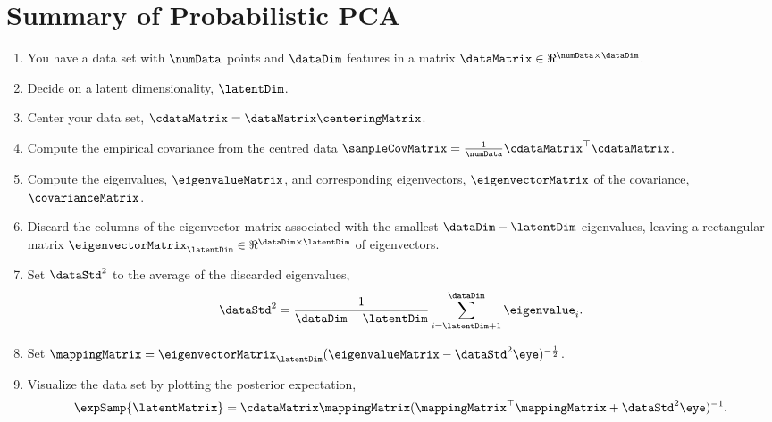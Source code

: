 \section{Summary of Probabilistic PCA}
\begin{enumerate}
\item You have a data set with $\numData$ points and $\dataDim$ features in a matrix $\dataMatrix \in \Re^{\numData \times \dataDim}$.
 \item Decide on a latent dimensionality, $\latentDim$.
 \item Center your data set, $\cdataMatrix = \dataMatrix\centeringMatrix$.
 \item Compute the empirical covariance from the centred data $\sampleCovMatrix = \frac{1}{\numData}\cdataMatrix^\top\cdataMatrix$.
 \item Compute the eigenvalues, $\eigenvalueMatrix$, and corresponding eigenvectors, $\eigenvectorMatrix$ of the covariance, $\covarianceMatrix$.
 \item Discard the columns of the eigenvector matrix associated with the smallest $\dataDim-\latentDim$ eigenvalues, leaving a rectangular matrix $\eigenvectorMatrix_\latentDim\in \Re^{\dataDim\times\latentDim}$ of eigenvectors. 
 \item Set $\dataStd^2$ to the average of the discarded eigenvalues,
   \[
   \dataStd^2 = \frac{1}{\dataDim-\latentDim} \sum_{i=\latentDim+1}^\dataDim \eigenvalue_i.
   \]
 \item Set $\mappingMatrix = \eigenvectorMatrix_\latentDim (\eigenvalueMatrix-\dataStd^2\eye)^{-\frac{1}{2}}$.
 \item Visualize the data set by plotting the posterior expectation,
   \[
   \expSamp{\latentMatrix} = \cdataMatrix\mappingMatrix(\mappingMatrix^\top\mappingMatrix + \dataStd^2 \eye)^{-1}.
   \]
\end{enumerate}

%     

